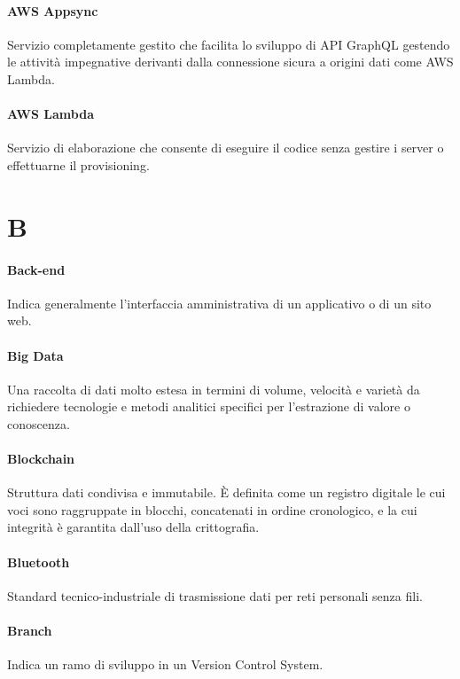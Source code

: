 \documentclass[]{article}
\begin{document}
	\paragraph*{AWS Appsync}
	Servizio completamente gestito che facilita lo sviluppo di API GraphQL gestendo le attività impegnative derivanti dalla connessione sicura a origini dati come AWS Lambda.

	\paragraph*{AWS Lambda}
	Servizio di elaborazione che consente di eseguire il codice senza gestire i server o effettuarne il provisioning.

	\newpage

	\section*{B}

	\paragraph*{Back-end}
	Indica generalmente l'interfaccia amministrativa di un applicativo o di un sito web.

	\paragraph*{Big Data}
	Una raccolta di dati molto estesa in termini di	volume, velocità e varietà da richiedere tecnologie e metodi analitici specifici per l'estrazione di valore o conoscenza.

	\paragraph*{Blockchain}
	Struttura dati condivisa e immutabile. È definita come un registro digitale le cui voci sono raggruppate in blocchi, concatenati in ordine cronologico, e la cui integrità è garantita dall'uso della crittografia.

	\paragraph*{Bluetooth}
	Standard tecnico-industriale di trasmissione dati per reti personali senza fili.

	\paragraph*{Branch}
	Indica un ramo di sviluppo in un Version Control System.
\end{document}
